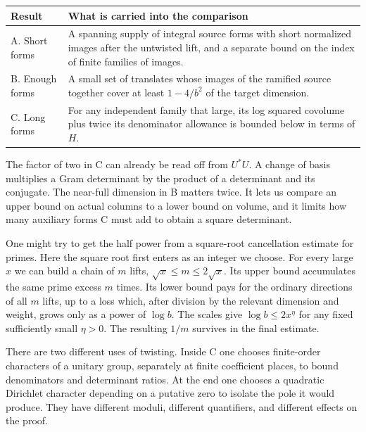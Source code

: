 \begin{center}\small
\renewcommand{\arraystretch}{1.17}
\begin{tabularx}{.97\linewidth}{@{}p{.21\linewidth}X@{}}
\toprule
Result & What is carried into the comparison\\ \midrule
A. Short forms & A spanning supply of integral source forms with short normalized images after the untwisted lift, and a separate bound on the index of finite families of images.\\
B. Enough forms & A small set of translates whose images of the ramified source together cover at least \(1-4/b^2\) of the target dimension.\\
C. Long forms & For any independent family that large, its log squared covolume plus twice its denominator allowance is bounded below in terms of \(H\).\\ \bottomrule
\end{tabularx}
\end{center}
The factor of two in C can already be read off from \(U^*U\). A change of basis multiplies a Gram determinant by the product of a determinant and its conjugate. The near-full dimension in B matters twice. It lets us compare an upper bound on actual columns to a lower bound on volume, and it limits how many auxiliary forms C must add to obtain a square determinant.

One might try to get the half power from a square-root cancellation estimate for primes. Here the square root first enters as an integer we choose. For every large \(x\) we can build a chain of \(m\) lifts, \(\sqrt x\le m\le2\sqrt x\). Its upper bound accumulates the same prime excess \(m\) times. Its lower bound pays for the ordinary directions of all \(m\) lifts, up to a loss which, after division by the relevant dimension and weight, grows only as a power of \(\log b\). The scales give \(\log b\le2x^\eta\) for any fixed sufficiently small \(\eta>0\). The resulting \(1/m\) survives in the final estimate.

There are two different uses of twisting. Inside C one chooses finite-order characters of a unitary group, separately at finite coefficient places, to bound denominators and determinant ratios. At the end one chooses a quadratic Dirichlet character depending on a putative zero to isolate the pole it would produce. They have different moduli, different quantifiers, and different effects on the proof.

